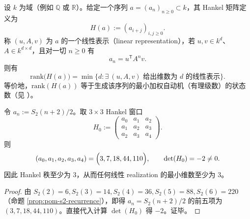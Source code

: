 \begin{theorem}\label{thm:hankel-rank-minimal}
设 \(k\) 为域（例如 \(\mathbb{Q}\) 或 \(\mathbb{R}\)）。给定一个序列 \(a=(a_n)_{n\ge 0}\subset k\)，其 Hankel 矩阵定义为
$$
H(a):=(a_{i+j})_{i,j\ge 0}.
$$
称 \((u,A,v)\) 为 \(a\) 的一个线性表示（linear representation），若 \(u,v\in k^d\)、\(A\in k^{d\times d}\)，且对一切 \(n\ge 0\) 有
$$
a_n=u^{\mathsf T}A^n v.
$$
则有
$$
\mathrm{rank}\bigl(H(a)\bigr)=\min\{d:\exists\ (u,A,v)\text{ 给出维数为 }d\text{ 的线性表示}\}.
$$
等价地，\(\mathrm{rank}(H(a))\) 等于生成该序列的最小加权自动机（有理级数）的状态数（见 \cite{BerstelReutenauer1988RationalSeries}）。
\end{theorem}

\begin{lemma}\label{lem:pom-s2-hankel-det}
令 \(a_n:=S_2(n+2)/2\)。取 \(3\times 3\) Hankel 窗口
$$
H_0:=
\begin{pmatrix}
a_0 & a_1 & a_2\\
a_1 & a_2 & a_3\\
a_2 & a_3 & a_4
\end{pmatrix}.
$$
则
$$
(a_0,a_1,a_2,a_3,a_4)=\Bigl(3,7,18,44,110\Bigr),
\qquad
\det(H_0)=-2\neq 0.
$$
因此 Hankel 秩至少为 \(3\)，从而任何线性 realization 的最小维数至少为 \(3\)。
\end{lemma}
\begin{proof}
由 \(S_2(2)=6,S_2(3)=14,S_2(4)=36,S_2(5)=88,S_2(6)=220\)（命题 \ref{prop:pom-s2-recurrence}），即得
\(
a_n=S_2(n+2)/2
\)
的前五项为 \((3,7,18,44,110)\)。直接代入计算 \(\det(H_0)\) 得 \(-2\)。证毕。
\end{proof}

